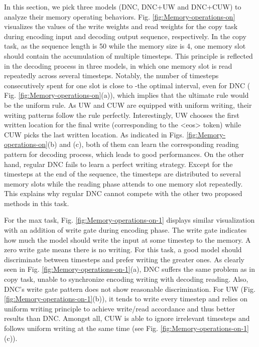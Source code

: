 In this section, we pick three models (DNC, DNC+UW and DNC+CUW) to
analyze their memory operating behaviors. Fig. \ref{fig:Memory-operations-on}
visualizes the values of the write weights and read weights for the
copy task during encoding input and decoding output sequence, respectively.
In the copy task, as the sequence length is 50 while the memory size
is 4, one memory slot should contain the accumulation of multiple
timesteps. This principle is reflected in the decoding process in
three models, in which one memory slot is read repeatedly across several
timesteps. Notably, the number of timesteps consecutively spent for
one slot is close to -the optimal interval, even for DNC ( Fig.
\ref{fig:Memory-operations-on}(a)), which implies that the ultimate
rule would be the uniform rule. As UW and CUW are equipped with uniform
writing, their writing patterns follow the rule perfectly. Interestingly,
UW chooses the first written location for the final write (corresponding
to the \textless eos\textgreater{} token) while CUW picks the last
written location. As indicated in Figs. \ref{fig:Memory-operations-on}(b)
and (c), both of them can learn the corresponding reading pattern
for decoding process, which leads to good performances. On the other
hand, regular DNC fails to learn a perfect writing strategy. Except
for the timesteps at the end of the sequence, the timesteps are distributed
to several memory slots while the reading phase attends to one memory
slot repeatedly. This explains why regular DNC cannot compete with
the other two proposed methods in this task. 

For the max task, Fig. \ref{fig:Memory-operations-on-1} displays
similar visualization with an addition of write gate during encoding
phase. The write gate indicates how much the model should write the
input at some timestep to the memory. A zero write gate means there
is no writing. For this task, a good model should discriminate between
timesteps and prefer writing the greater ones. As clearly seen in
Fig. \ref{fig:Memory-operations-on-1}(a), DNC suffers the same problem
as in copy task, unable to synchronize encoding writing with decoding
reading. Also, DNC's write gate pattern does not show reasonable discrimination.
For UW (Fig. \ref{fig:Memory-operations-on-1}(b)), it tends to write
every timestep and relies on uniform writing principle to achieve
write/read accordance and thus better results than DNC. Amongst all,
CUW is able to ignore irrelevant timesteps and follows uniform writing
at the same time (see Fig. \ref{fig:Memory-operations-on-1}(c)).

